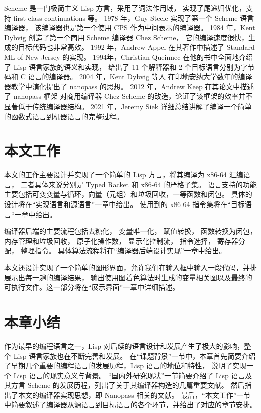 Scheme 是一门极简主义 Lisp 方言，采用了词法作用域，
实现了尾递归优化，支持 first-class continuations 等。
1978 年，Guy Steele\cite{Steele_1978} 实现了第一个 Scheme 语言编译器，
该编译器也是第一个使用 CPS 作为中间表示的编译器。
1984 年，Kent Dybvig 创造了第一个商用 Scheme 编译器 Chez Scheme\cite{Dybvig_2006}，
它的编译速度很快，生成的目标代码也非常高效。
1992 年，Andrew Appel\cite{Appel_1992} 在其著作中描述了 Standard ML of New Jersey 的实现。
1994年，Christian Queinnec\cite{Queinnec_1996} 在他的书中全面地介绍了 Lisp 语言家族的语义和实现，
给出了 11 个解释器和 2 个目标语言分别为字节码和 C 语言的编译器。
2004 年，Kent Dybvig 等人\cite{Sarkar_Waddell_Dybvig_2004}
在印地安纳大学数年的编译器教学中演化提出了 nanopass 的思想。
2012 年，Andrew Keep\cite{Keep_Dybvig_2013} 在其论文中描述了 nanopass 框架
对商用编译器 Chez Scheme 的改造，论证了该框架的效率并不显著低于传统编译器结构。
2021 年，Jeremy Siek\cite{Siek_2022} 详细总结讲解了编译一个简单的函数式语言到机器语言的完整过程。

\section{本文工作}

本文的工作主要设计并实现了一个简单的 Lisp 方言，将其编译为 x86-64 汇编语言，
二者具体来说分别是 Typed Racket 和 x86-64 的严格子集。
语言支持的功能主要包括可变变量与循环，向量（元组）和垃圾回收，一等函数和闭包。
具体的设计将在“实现语言和源语言”一章中给出。
使用到的 x86-64 指令集将在“目标语言“一章中给出。

编译器后端的主要流程包括去糖化，
变量唯一化，
赋值转换，
函数转换为闭包，
内存管理和垃圾回收，
原子化操作数，
显示化控制流，
指令选择，
寄存器分配，
整理指令。
具体算法流程将在“编译器后端设计实现”一章中给出。

本文还设计实现了一个简单的图形界面，允许我们在输入框中输入一段代码，并排展示出每一趟的编译结果，
输出使用图着色算法时生成的变量相关图以及最终的可执行文件。这一部分将在“展示界面”一章中详细描述。

\section{本章小结}

作为最早的编程语言之一，Lisp 对后续的语言设计和发展产生了极大的影响，整个 Lisp 语言家族也在不断完善和发展。
在“课题背景”一节中，本章首先简要介绍了早期几个重要的编程语言的发展历程，Lisp 语言的地位和特性，
说明了实现一个 Lisp 语言的现实意义与背景。
“国内外研究现状”一节简要介绍了 Lisp 语言及其方言 Scheme 的发展历程，列出了关于其编译器构造的几篇重要文献。
然后指出了本文的编译器实现思想，即 Nanopass 相关的文献。
最后，“本文工作”一节中简要叙述了编译器从源语言到目标语言的各个环节，并给出了对应的章节安排。
